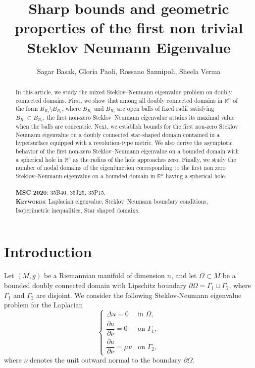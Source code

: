 \documentclass[12pt,reqno]{amsart}
\title [Mixed Steklov Neumann eigenvalues]{ Sharp bounds and geometric properties of the first non trivial Steklov Neumann Eigenvalue  }
\author{Sagar Basak, Gloria Paoli, Rossano Sannipoli, Sheela Verma}
\numberwithin{equation}{section}
\numberwithin{theorem}{section}
\numberwithin{equation}{section}
\numberwithin{theorem}{section}
\begin{document}
\begin{abstract}
In this article, we study the mixed Steklov--Neumann eigenvalue problem on doubly connected domains. First, we show that among all doubly connected domains in $\mathbb{R}^n$ of the form $B_{R_2}\setminus \overline{B_{R_1}}$, where $B_{R_1}$ and $B_{R_2}$ are open balls of fixed radii satisfying $\overline{B_{R_1}} \subset B_{R_2}$, the first non-zero Steklov--Neumann eigenvalue attains its maximal value when the balls are concentric. Next, we establish bounds for the first non-zero Steklov--Neumann eigenvalue on a doubly connected star-shaped domain contained in a hypersurface equipped with a revolution-type metric. We also derive the asymptotic behavior of the first non-zero Steklov--Neumann eigenvalue on a bounded domain with a spherical hole in $\mathbb{R}^n$ as the radius of the hole approaches zero. Finally, we study the number of nodal domains of the eigenfunction corresponding to the first non zero Steklov--Neumann eigenvalue on a bounded domain in $\mathbb{R}^n$ having a spherical hole. 
\\ \\
\noindent\textsc{\textbf{MSC 2020}:} 35B40, 35J25, 35P15. \\
\textsc{\textbf{Keywords}}:  Laplacian eigenvalue, Steklov--Neumann boundary conditions, Isoperimetric inequalities, Star shaped domains.
\end{abstract}
\maketitle

\section{Introduction}


 Let $(M, g)$ be a Riemannian manifold of
dimension $n$, and let $\Omega \subset M$ be a bounded doubly connected
domain with Lipschitz boundary
$\partial \Omega = \Gamma_1 \cup \Gamma_2$, where $\Gamma_1$ and
$\Gamma_2$ are disjoint. We consider the following Steklov-Neumann eigenvalue problem for the Laplacian
\begin{equation}\label{SN Problem}
\begin{cases}
\Delta u = 0 & \text{in } \Omega, \\
\dfrac{\partial u}{\partial \nu} = 0 & \text{on } \Gamma_1, \\
\dfrac{\partial u}{\partial \nu} = \mu u & \text{on } \Gamma_2,
\end{cases}
\end{equation}
where $ \nu$ denotes the unit outward normal to the boundary $\partial\Omega$.
\end{document}
